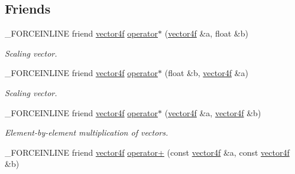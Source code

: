 \subsection*{Friends}
\begin{DoxyCompactItemize}
\item 
\hypertarget{classbt_1_1vector4f_a787a79ad03f2b7d7baf4aee464bfa96e}{\-\_\-\-F\-O\-R\-C\-E\-I\-N\-L\-I\-N\-E friend \hyperlink{classbt_1_1vector4f}{vector4f} \hyperlink{classbt_1_1vector4f_a787a79ad03f2b7d7baf4aee464bfa96e}{operator$\ast$} (\hyperlink{classbt_1_1vector4f}{vector4f} \&a, float \&b)}\label{classbt_1_1vector4f_a787a79ad03f2b7d7baf4aee464bfa96e}

\begin{DoxyCompactList}\small\item\em Scaling vector. \end{DoxyCompactList}\item 
\hypertarget{classbt_1_1vector4f_a537a41b4c2712839bd0fecec0d4daf8e}{\-\_\-\-F\-O\-R\-C\-E\-I\-N\-L\-I\-N\-E friend \hyperlink{classbt_1_1vector4f}{vector4f} \hyperlink{classbt_1_1vector4f_a537a41b4c2712839bd0fecec0d4daf8e}{operator$\ast$} (float \&b, \hyperlink{classbt_1_1vector4f}{vector4f} \&a)}\label{classbt_1_1vector4f_a537a41b4c2712839bd0fecec0d4daf8e}

\begin{DoxyCompactList}\small\item\em Scaling vector. \end{DoxyCompactList}\item 
\hypertarget{classbt_1_1vector4f_abefc76ba793842fed44220e88c8277fe}{\-\_\-\-F\-O\-R\-C\-E\-I\-N\-L\-I\-N\-E friend \hyperlink{classbt_1_1vector4f}{vector4f} \hyperlink{classbt_1_1vector4f_abefc76ba793842fed44220e88c8277fe}{operator$\ast$} (\hyperlink{classbt_1_1vector4f}{vector4f} \&a, \hyperlink{classbt_1_1vector4f}{vector4f} \&b)}\label{classbt_1_1vector4f_abefc76ba793842fed44220e88c8277fe}

\begin{DoxyCompactList}\small\item\em Element-\/by-\/element multiplication of vectors. \end{DoxyCompactList}\item 
\hypertarget{classbt_1_1vector4f_a453f0518ab9d734fbb9592096dfa653b}{\-\_\-\-F\-O\-R\-C\-E\-I\-N\-L\-I\-N\-E friend \hyperlink{classbt_1_1vector4f}{vector4f} \hyperlink{classbt_1_1vector4f_a453f0518ab9d734fbb9592096dfa653b}{operator+} (const \hyperlink{classbt_1_1vector4f}{vector4f} \&a, const \hyperlink{classbt_1_1vector4f}{vector4f} \&b)}\label{classbt_1_1vector4f_a453f0518ab9d734fbb9592096dfa653b}


\end{DoxyCompactItemize}
